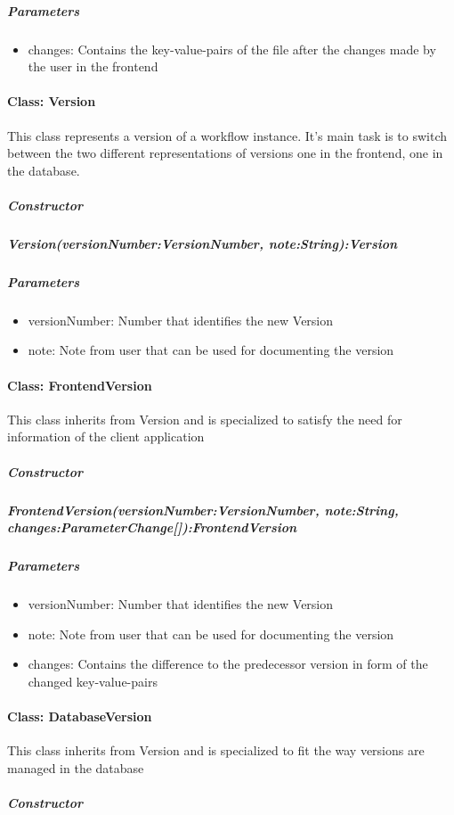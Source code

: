 \subparagraph{Parameters}
\begin{itemize}
	\item{changes:}
	Contains the key-value-pairs of the file after the changes made by the user in the frontend
\end{itemize}


\paragraph{Class: Version}
This class represents a version of a workflow instance. It's main task is to switch between the two different representations of versions one in the frontend, one in the database.
\subparagraph{Constructor}

\subparagraph{Version(versionNumber:VersionNumber, note:String):Version}

\subparagraph{Parameters}
\begin{itemize}
	\item{versionNumber:}
	Number that identifies the new Version
	\item{note:}
	Note from user that can be used for documenting the version
\end{itemize}

\paragraph{Class: FrontendVersion}
This class inherits from Version and is specialized to satisfy the need for information of the client application
\subparagraph{Constructor}

\subparagraph{FrontendVersion(versionNumber:VersionNumber, note:String, changes:ParameterChange[]):FrontendVersion}

\subparagraph{Parameters}
\begin{itemize}
	\item{versionNumber:}
	Number that identifies the new Version
	\item{note:}
	Note from user that can be used for documenting the version
	\item{changes:}
	Contains the difference to the predecessor version in form of the changed key-value-pairs
\end{itemize}

\paragraph{Class: DatabaseVersion}
This class inherits from Version and is specialized to fit the way versions are managed in the database
\subparagraph{Constructor}

